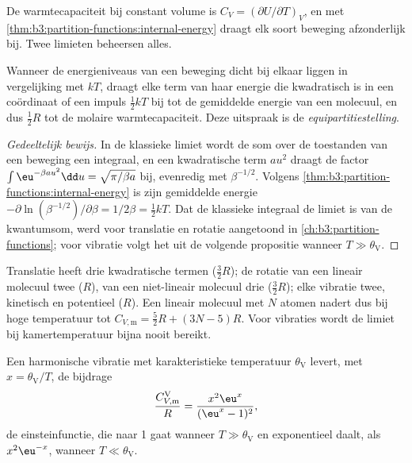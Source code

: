 De warmtecapaciteit bij constant volume is $C_V = (\partial U/\partial T)_V$, en met
\cref{thm:b3:partition-functions:internal-energy} draagt elk soort beweging
afzonderlijk bij. Twee limieten beheersen alles.

\begin{theorem}[Equipartitiestelling]\label{thm:b3:statistical-thermo-applied:equipartition}
Wanneer de energieniveaus van een beweging dicht bij elkaar liggen in
vergelijking met $kT$, draagt elke term van haar energie die kwadratisch
is in een coördinaat of een impuls
$\frac12kT$ bij tot de gemiddelde energie van een molecuul, en dus $\frac12R$ tot de
molaire warmtecapaciteit. Deze uitspraak is de
\emph{equipartitiestelling}.
\end{theorem}

\begin{proof}[Gedeeltelijk bewijs]
In de klassieke limiet wordt de som over de toestanden van een beweging
een integraal, en een kwadratische term $a u^2$ draagt de factor $\int\eu^{-\beta au^2}\dd u =
\sqrt{\pi/\beta a}$ bij, evenredig met $\beta^{-1/2}$. Volgens
\cref{thm:b3:partition-functions:internal-energy} is zijn gemiddelde energie
$-\partial\ln(\beta^{-1/2})/\partial\beta = 1/2\beta = \frac12kT$. Dat de
klassieke integraal de limiet is van de kwantumsom, werd voor translatie
en rotatie aangetoond in
\cref{ch:b3:partition-functions}; voor vibratie volgt het uit de volgende
propositie wanneer $T \gg \theta_{\mathrm V}$.
\end{proof}

Translatie heeft drie kwadratische termen ($\frac32R$); de rotatie van een
lineair molecuul twee ($R$), van een niet-lineair molecuul drie
($\frac32R$); elke vibratie twee, kinetisch en potentieel ($R$). Een
lineair molecuul met $N$ atomen nadert dus bij hoge temperatuur tot
$C_{V,\mathrm m} = \frac52R + (3N - 5)R$. Voor vibraties wordt de limiet
bij kamertemperatuur bijna nooit bereikt.

\begin{proposition}[Vibratiewarmtecapaciteit]\label{prop:b3:statistical-thermo-applied:cv-vib}
Een harmonische vibratie met karakteristieke temperatuur $\theta_{\mathrm V}$ levert, met
$x = \theta_{\mathrm V}/T$, de bijdrage
\[
  \frac{C_{V,\mathrm m}^{\mathrm V}}{R} = \frac{x^2\eu^x}{(\eu^x - 1)^2},
\]
de einsteinfunctie, die naar 1 gaat wanneer $T \gg \theta_{\mathrm V}$ en
exponentieel daalt, als $x^2\eu^{-x}$, wanneer $T \ll \theta_{\mathrm V}$.
\end{proposition}

